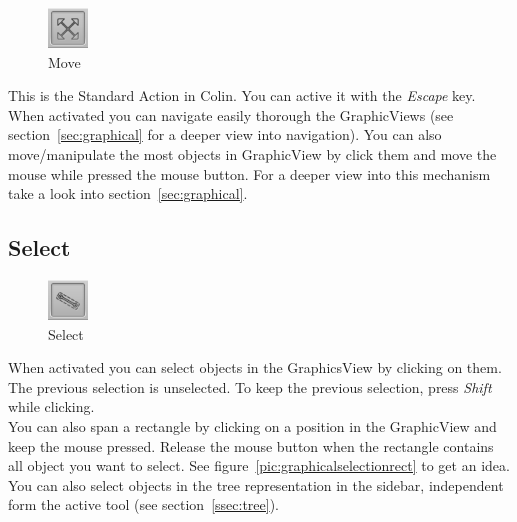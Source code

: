 \documentclass[a4paper,11pt]{report}
\begin{document}
\begin{minipage}[h]{4cm}
\begin{figure}[H]
\begin{center}
\includegraphics[scale=0.6]{../pictures/movetoolbar.png}
\caption{Move}
\label{pic:movetoolbar}
\end{center}
\end{figure}
\end{minipage}
\begin{minipage}[h]{\textwidth-4cm}
This is the Standard Action in Colin. You can active it with the \textit{Escape} key. When activated you can navigate easily thorough the GraphicViews (see section~\ref{sec:graphical} for a deeper view into navigation). 
You can also move/manipulate the most objects in GraphicView by click them and move the mouse while pressed the mouse button. For a deeper view into this mechanism take a look into section~\ref{sec:graphical}.
\end{minipage}

\subsection{Select}

\begin{minipage}[h]{4cm}
\begin{figure}[H]
\begin{center}
\includegraphics[scale=0.6]{../pictures/selecttoolbar.png}
\caption{Select}
\label{pic:selecttoolbar}
\end{center}
\end{figure}
\end{minipage}
\begin{minipage}[h]{\textwidth-4cm}
When activated you can select objects in the GraphicsView by clicking on them. The previous selection is unselected. To keep the previous selection, press \textit{Shift} while clicking.\\
You can also span a rectangle by clicking on a position in the GraphicView and keep the mouse pressed. Release the mouse button when the rectangle contains all object you want to select. See figure~\ref{pic:graphicalselectionrect} to get an idea. You can also select objects in the tree representation in the sidebar, independent form the active tool (see section~\ref{ssec:tree}).
\end{minipage}
\end{document}
